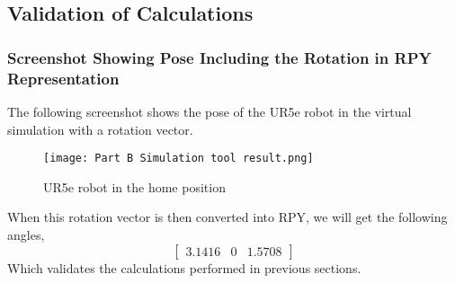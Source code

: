 \subsection{Validation of Calculations}
\subsubsection{Screenshot Showing Pose Including the Rotation in RPY Representation}
The following screenshot shows the pose of the UR5e robot in the virtual simulation with a rotation vector.
\begin{figure}[H]
    \centering
    \texttt{[image: Part B Simulation tool result.png]}
    \caption{UR5e robot in the home position}
    \label{fig:UR5e robot in the home position}
\end{figure}

When this rotation vector is then converted into RPY, we will get the following angles,
\begin{equation*}
    \begin{bmatrix}
        3.1416 & 0 & 1.5708
    \end{bmatrix}
\end{equation*}
Which validates the calculations performed in previous sections.

